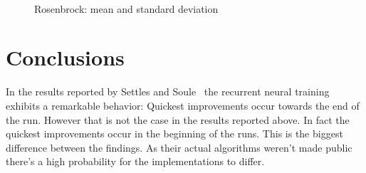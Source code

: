\documentclass{acm_proc_article-sp}
\begin{document}
\begin{figure}[ht]
\centering
\mbox{
\quad
{}
}
\caption{Rosenbrock: mean and standard deviation}\label{gra:rosenbrock}
\end{figure}

\section{Conclusions}\label{sec:conclusions}
In the results reported by Settles and Soule~\cite{SET052} the recurrent neural training exhibits a remarkable behavior: Quickest improvements occur towards the end of the run. However that is not the case in the results reported above. In fact the quickest improvements occur in the beginning of the runs. This is the biggest difference between the findings. As their actual algorithms weren't made public there's a high probability for the implementations to differ. 
\end{document}
